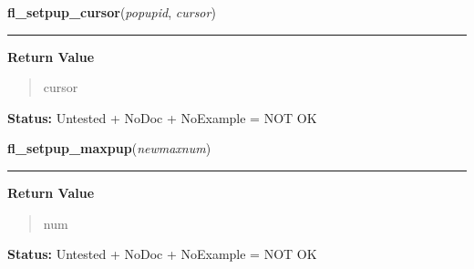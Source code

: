 \hspace{.8\funcindent}\begin{boxedminipage}{\funcwidth}

    \raggedright \textbf{fl\_setpup\_cursor}(\textit{popupid}, \textit{cursor})

    \vspace{-1.5ex}

    \rule{\textwidth}{0.5\fboxrule}
\setlength{\parskip}{2ex}
\setlength{\parskip}{1ex}
      \textbf{Return Value}
    \vspace{-1ex}

      \begin{quote}
      cursor

      \end{quote}

\textbf{Status:} Untested + NoDoc + NoExample = NOT OK



    \end{boxedminipage}

    \label{xformslib:library:fl_setpup_maxpup}

    \vspace{0.5ex}

\hspace{.8\funcindent}\begin{boxedminipage}{\funcwidth}

    \raggedright \textbf{fl\_setpup\_maxpup}(\textit{newmaxnum})

    \vspace{-1.5ex}

    \rule{\textwidth}{0.5\fboxrule}
\setlength{\parskip}{2ex}
\setlength{\parskip}{1ex}
      \textbf{Return Value}
    \vspace{-1ex}

      \begin{quote}
      num

      \end{quote}

\textbf{Status:} Untested + NoDoc + NoExample = NOT OK



    \end{boxedminipage}

    \label{xformslib:library:fl_getpup_mode}

